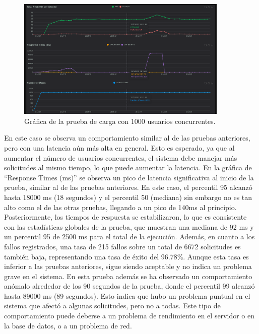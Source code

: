 \begin{figure}[H]
\centering
\includegraphics[width=0.9\textwidth]{figures/08_1000_1.png}
\caption{Gráfica de la prueba de carga con 1000 usuarios concurrentes.}
\label{fig:locust1000}
\end{figure}

En este caso se observa un comportamiento similar al de las pruebas anteriores, pero con una latencia aún más alta en general. Esto es esperado, ya que al aumentar el número de usuarios concurrentes, el sistema debe manejar más solicitudes al mismo tiempo, lo que puede aumentar la latencia.
\newline\newline
En la gráfica de ``Response Times (ms)'' se observa un pico de latencia significativa al inicio de la prueba, similar al de las pruebas anteriores. En este caso, el percentil 95 alcanzó hasta 18000 ms (18 segundos) y el percentil 50 (mediana) sin embargo no es tan alto como el de las otras pruebas, llegando a un pico de 140ms al principio. Posteriormente, los tiempos de respuesta se estabilizaron, lo que es consistente con las estadísticas globales de la prueba, que muestran una mediana de 92 ms y un percentil 95 de 2500 ms para el total de la ejecución.
\newline\newline
Además, en cuanto a los fallos registrados, una tasa de 215 fallos sobre un total de 6672 solicitudes es también baja, representando una tasa de éxito del 96.78\%. Aunque esta tasa es inferior a las pruebas anteriores, sigue siendo aceptable y no indica un problema grave en el sistema.
\newline\newline
En esta prueba además se ha observado un comportamiento anómalo alrededor de los 90 segundos de la prueba, donde el percentil 99 alcanzó hasta 89000 ms (89 segundos). Esto indica que hubo un problema puntual en el sistema que afectó a algunas solicitudes, pero no a todas. Este tipo de comportamiento puede deberse a un problema de rendimiento en el servidor o en la base de datos, o a un problema de red.

